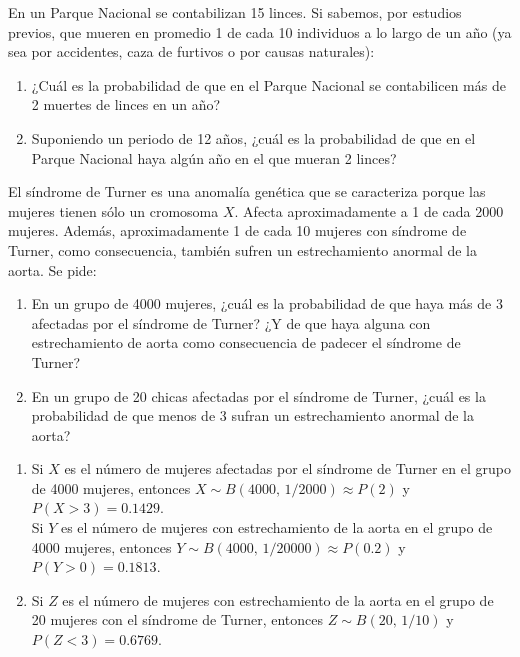 {En un Parque Nacional se contabilizan 15 linces. Si sabemos, por estudios previos, que mueren en promedio 1 de cada 10 individuos a lo largo de un año (ya sea por accidentes, caza de furtivos o por causas naturales):
\begin{enumerate}
\item ¿Cuál es la probabilidad de que en el Parque Nacional se contabilicen más de 2 muertes de linces en un año?
\item Suponiendo un periodo de 12 años, ¿cuál es la probabilidad de que en el Parque Nacional haya algún año
en el que mueran 2 linces?
\end{enumerate}
}
{}
{}


{El síndrome de Turner es una anomalía genética que se caracteriza porque las mujeres tienen sólo un cromosoma $X$.
Afecta aproximadamente a 1 de cada 2000 mujeres.
Además, aproximadamente 1 de cada 10 mujeres con síndrome de Turner, como consecuencia, también sufren un
estrechamiento anormal de la aorta.
Se pide:
\begin{enumerate}
\item En un grupo de 4000 mujeres, ¿cuál es la probabilidad de que haya más de 3 afectadas por el síndrome de Turner?
¿Y de que haya alguna con estrechamiento de aorta como consecuencia de padecer el síndrome de Turner?
\item En un grupo de 20 chicas afectadas por el síndrome de Turner, ¿cuál es la probabilidad de que menos de 3 sufran
un estrechamiento anormal de la aorta?
\end{enumerate}
}
{
\begin{enumerate}
\item Si $X$ es el número de mujeres afectadas por el síndrome de Turner en el grupo de 4000 mujeres, entonces $X\sim
B(4000,\,1/2000)\approx P(2)$ y $P(X>3)=0.1429$.\\
Si $Y$ es el número de mujeres con estrechamiento de la aorta en el grupo de 4000 mujeres, entonces $Y\sim
B(4000,\,1/20000)\approx P(0.2)$ y $P(Y>0)=0.1813$.
\item Si $Z$ es el número de mujeres con estrechamiento de la aorta en el grupo de 20 mujeres con el síndrome de
Turner, entonces $Z\sim B(20,\,1/10)$ y $P(Z<3)=0.6769$.
\end{enumerate}
}
{}


